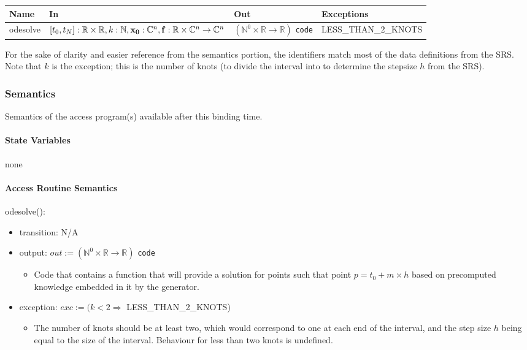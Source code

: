 \documentclass[12pt, titlepage]{article}
\begin{document}
\begin{center}
  \begin{tabular}{p{1.6cm} p{5.8cm} p{3.2cm} p{4.2cm}}
    \hline
    \textbf{Name} & \textbf{In} & \textbf{Out} & \textbf{Exceptions} \\
    \hline
    odesolve &
    $ [t_0,t_N] : \mathbb{R} \times \mathbb{R} , k : \mathbb{N} , 
    {\bf x_0} : \mathbb{C}^n , {\bf f} : \mathbb{R} \times \mathbb{C}^n 
    \rightarrow \mathbb{C}^n $ &
    $(\mathbb{N}^0 \times \mathbb{R} \rightarrow \mathbb{R})$ \texttt{code} & 
    LESS\_THAN\_2\_KNOTS \\
    \hline
  \end{tabular}
\end{center}
For the sake of clarity and easier reference from the semantics portion, the 
identifiers match most of the data definitions from the SRS. Note that $k$ is 
the exception; this is the number of knots (to divide the interval into to 
determine the stepsize $h$ from the SRS).

\subsubsection{Semantics}
Semantics of the access program(s) available after this binding time.

\paragraph{State Variables}

none

\paragraph{Access Routine Semantics}

\noindent odesolve():
\begin{itemize}
  \item transition: N/A
  \item output: $ out := (\mathbb{N}^0 \times \mathbb{R} \rightarrow 
  \mathbb{R})$ 
  \texttt{code}
  \begin{itemize}
    \item Code that contains a function that will provide a solution for points 
    such that point $p = t_0 + m \times h$ based on precomputed knowledge embedded in it by the generator.
  \end{itemize}
  \item exception: $exc := (k < 2 \Rightarrow$ LESS\_THAN\_2\_KNOTS)
  \begin{itemize}
    \item The number of knots should be at least two, which would correspond to 
    one at each end of the interval, and the step size $h$ being equal to the 
    size of the interval. Behaviour for less than two knots is undefined.
  \end{itemize}
\end{itemize}
\end{document}
